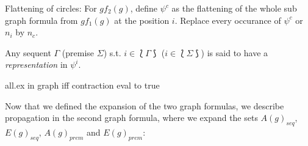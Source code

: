 \documentclass{llncs}
\begin{document}
Flattening of circles: For $gf_2(g)$, define $\psi^c$ as the flattening of the whole sub graph formula from $gf_1(g)$ at the
position $i$. Replace every occurance of $\psi^c$ or $n_{i}$ by $n_c$.

\begin{definition}
Any sequent $\Gamma$ (premise $\Sigma$) s.t. $i\in\lbag\Gamma\rbag$ ($i\in\lbag\Sigma\rbag$) is said to have a
\emph{representation} in $\psi^i$.
\end{definition}

\begin{example}
all.ex in graph iff contraction eval to true
\end{example}


Now that we defined the expansion of the two graph formulas, we describe propagation in
the second graph formula, where we expand the sets $A(g)_{seq}$, $E(g)_{seq}$, $A(g)_{prem}$ and $E(g)_{prem}$:
\end{document}
